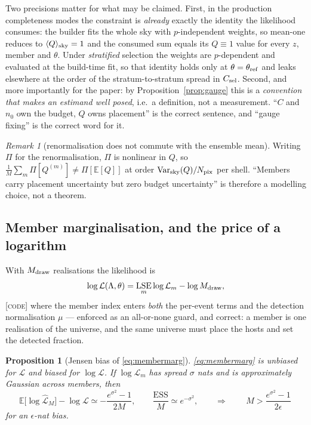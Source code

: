 \documentclass[11pt]{article}
\newtheorem{proposition}{Proposition}
\theoremstyle{definition}
\theoremstyle{remark}
\newtheorem{remark}{Remark}
\newcommand{\Mdraw}{M_{\rm draw}}
\newcommand{\LSE}{\mathop{\mathrm{LSE}}}
\newcommand{\Var}{\mathrm{Var}}
\newcommand{\Npix}{N_{\rm pix}}
\newcommand{\ESS}{\mathrm{ESS}}
\begin{document}
Two precisions matter for what may be claimed. First, in the production
completeness modes the constraint is \emph{already} exactly the identity the
likelihood consumes: the builder fits the whole sky with $p$-independent weights,
so mean-one reduces to $\langle Q\rangle_{\rm sky}=1$ and the consumed sum equals
its $Q\equiv1$ value for every $z$, member and $\theta$. Under \emph{stratified}
selection the weights are $p$-dependent and evaluated at the build-time fit, so
that identity holds only at $\theta=\theta_{\rm ref}$ and leaks elsewhere at the
order of the stratum-to-stratum spread in $C_{\rm sel}$. Second, and more
importantly for the paper: by Proposition~\ref{prop:gauge} this is a
\emph{convention that makes an estimand well posed}, i.e.\ a definition, not a
measurement. ``$C$ and $n_0$ own the budget, $Q$ owns placement'' is the correct
sentence, and ``gauge fixing'' is the correct word for it.

\begin{remark}[renormalisation does not commute with the ensemble mean]
\label{rem:noncommute}
Writing $\Pi$ for the renormalisation, $\Pi$ is nonlinear in $Q$, so
$\frac1M\sum_m\Pi[Q^{(m)}]\neq\Pi[\mathbb E[Q]]$ at order
$\Var_{\rm sky}(Q)/\Npix$ per shell. ``Members carry placement uncertainty but zero
budget uncertainty'' is therefore a modelling choice, not a theorem.
\end{remark}

\subsection{Member marginalisation, and the price of a logarithm}

With $\Mdraw$ realisations the likelihood is
\begin{equation}
  \log\mathcal L(\Lambda,\theta)=\LSE_m\log\mathcal L_m-\log\Mdraw,
  \label{eq:membermarg}
\end{equation}
\textsc{[code]} where the member index enters \emph{both} the per-event terms and
the detection normalisation $\mu$ --- enforced as an all-or-none guard, and
correct: a member is one realisation of the universe, and the same universe must
place the hosts and set the detected fraction.

\begin{proposition}[Jensen bias of \eqref{eq:membermarg}]
\label{prop:jensen}
\eqref{eq:membermarg} is unbiased for $\mathcal L$ and biased for
$\log\mathcal L$. If $\log\mathcal L_m$ has spread $\sigma$ nats and is
approximately Gaussian across members, then
\begin{equation}
  \mathbb E\big[\log\widehat{\mathcal L}_M\big]-\log\mathcal L
  \simeq-\frac{e^{\sigma^2}-1}{2M},
  \qquad \frac{\ESS}{M}\simeq e^{-\sigma^2},
  \qquad\Longrightarrow\qquad
  \boxed{\,M>\frac{e^{\sigma^2}-1}{2\epsilon}\,}
  \label{eq:Mrequired}
\end{equation}
for an $\epsilon$-nat bias.
\end{proposition}
\end{document}
